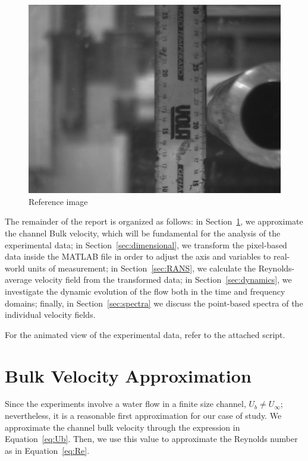 \documentclass[12pt]{article}
\begin{document}
        \begin{figure}[ht!]
                \centering
                \includegraphics[width=\textwidth]{Reference.png}
                \caption{Reference image}
                \label{fig:reference}
        \end{figure}

        The remainder of the report is organized as follows: in Section~\ref{sec:bulk_velocity}, we approximate the channel Bulk velocity, which will be fundamental for the analysis of the experimental data; in Section~\ref{sec:dimensional}, we transform the pixel-based data inside the MATLAB file in order to adjust the axis and variables to real-world units of measurement; in Section~\ref{sec:RANS}, we calculate the Reynolds-average velocity field from the transformed data; in Section~\ref{sec:dynamics}, we investigate the dynamic evolution of the flow both in the time and frequency domains; finally, in Section~\ref{sec:spectra} we discuss the point-based spectra of the individual velocity fields.

        For the animated view of the experimental data, refer to the attached script.

\section{Bulk Velocity Approximation} \label{sec:bulk_velocity}

        Since the experiments involve a water flow in a finite size channel, $ U_b \neq U_\infty $; nevertheless, it is a reasonable first approximation for our case of study. We approximate the channel bulk velocity through the expression in Equation~\ref{eq:Ub}. Then, we use this value to approximate the Reynolds number as in Equation~\ref{eq:Re}.
\end{document}
